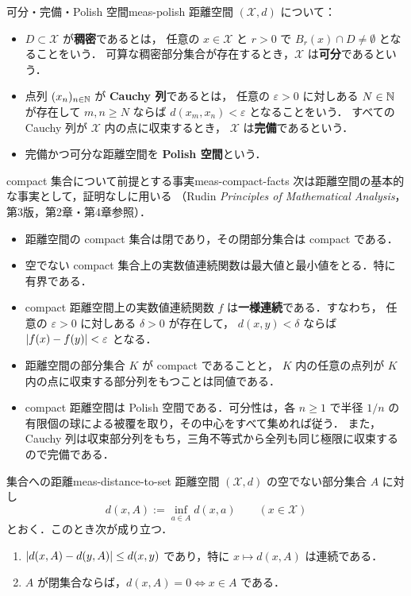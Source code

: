 \begin{definition}{可分・完備・Polish 空間}{meas-polish}
  距離空間 $(\mathcal{X},d)$ について：
  \begin{itemize}
    \item $D\subset \mathcal{X}$ が\textbf{稠密}であるとは，
      任意の $x\in \mathcal{X}$ と $r>0$ で $B_r(x)\cap D\neq\emptyset$
      となることをいう．
      可算な稠密部分集合が存在するとき，$\mathcal{X}$ は\textbf{可分}であるという．
    \item 点列 $(x_n)_{n\in\mathbb{N}}$ が \textbf{Cauchy 列}であるとは，
      任意の $\varepsilon>0$ に対しある $N\in\mathbb{N}$ が存在して
      $m,n\geq N$ ならば $d(x_m,x_n)<\varepsilon$ となることをいう．
      すべての Cauchy 列が $\mathcal{X}$ 内の点に収束するとき，
      $\mathcal{X}$ は\textbf{完備}であるという．
    \item 完備かつ可分な距離空間を \textbf{Polish 空間}という．
  \end{itemize}
\end{definition}

\begin{remark}{compact 集合について前提とする事実}{meas-compact-facts}
  次は距離空間の基本的な事実として，証明なしに用いる
  （Rudin \emph{Principles of Mathematical Analysis}，第3版，第2章・第4章参照）．
  \begin{itemize}
    \item 距離空間の compact 集合は閉であり，その閉部分集合は compact である．
    \item 空でない compact 集合上の実数値連続関数は最大値と最小値をとる．特に有界である．
    \item compact 距離空間上の実数値連続関数 $f$ は\textbf{一様連続}である．すなわち，
      任意の $\varepsilon>0$ に対しある $\delta>0$ が存在して，
      $d(x,y)<\delta$ ならば $\lvert f(x)-f(y) \rvert<\varepsilon$ となる．
    \item 距離空間の部分集合 $K$ が compact であることと，
      $K$ 内の任意の点列が $K$ 内の点に収束する部分列をもつことは同値である．
    \item compact 距離空間は Polish 空間である．可分性は，各 $n\geq1$ で半径 $1/n$ の
      有限個の球による被覆を取り，その中心をすべて集めれば従う．
      また，Cauchy 列は収束部分列をもち，三角不等式から全列も同じ極限に収束するので完備である．
  \end{itemize}
\end{remark}

\begin{lemma}{集合への距離}{meas-distance-to-set}
  距離空間 $(\mathcal{X},d)$ の空でない部分集合 $A$ に対し
  \[
    d(x,A):=\inf_{a\in A}d(x,a)\qquad(x\in\mathcal{X})
  \]
  とおく．このとき次が成り立つ．
  \begin{enumerate}
    \item $\lvert d(x,A)-d(y,A) \rvert\leq d(x,y)$ であり，特に $x\mapsto d(x,A)$ は連続である．
    \item $A$ が閉集合ならば，$d(x,A)=0\iff x\in A$ である．
  \end{enumerate}
\end{lemma}

